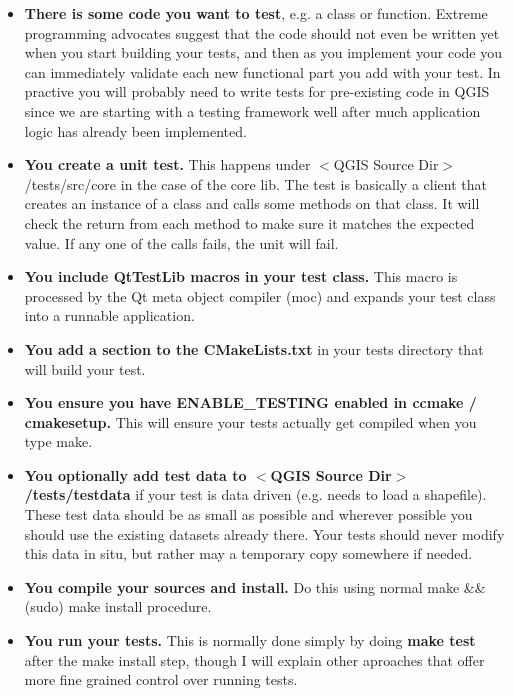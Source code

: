 \begin{itemize}
\item \textbf{There is some code you want to test}, e.g. a class or function. Extreme
   programming advocates suggest that the code should not even be written yet 
   when you start building your tests, and then as you implement your code you can
   immediately validate each new functional part you add with your test. In
   practive you will probably need to write tests for pre-existing code in QGIS
   since we are starting with a testing framework well after much application
   logic has already been implemented.

\item \textbf{You create a unit test.} This happens under $<$QGIS Source Dir$>$/tests/src/core 
   in the case of the core lib. The test is basically a client that creates an
   instance of a class and calls some methods on that class. It will check the
   return from each method to make sure it matches the expected value. If any
   one of the calls fails, the unit will fail.

\item \textbf{You include QtTestLib macros in your test class.} This macro is processed by 
   the Qt meta object compiler (moc) and expands your test class into a
   runnable application. 

\item \textbf{You add a section to the CMakeLists.txt} in your tests directory that will
   build your test.

\item \textbf{You ensure you have ENABLE\_TESTING enabled in ccmake / cmakesetup.} This 
   will ensure your tests actually get compiled when you type make.

\item \textbf{You optionally add test data to $<$QGIS Source Dir$>$/tests/testdata} if your 
   test is data driven (e.g. needs to load a shapefile). These test data should
   be as small as possible and wherever possible you should use the existing
   datasets already there. Your tests should never modify this data in situ,
   but rather may a temporary copy somewhere if needed.

\item \textbf{You compile your sources and install.} Do this using normal make \&\& (sudo) 
   make install procedure.

\item \textbf{You run your tests.} This is normally done simply by doing \textbf{make test} 
 after the make install step, though I will explain other aproaches that offer
 more fine grained control over running tests.

\end{itemize}


